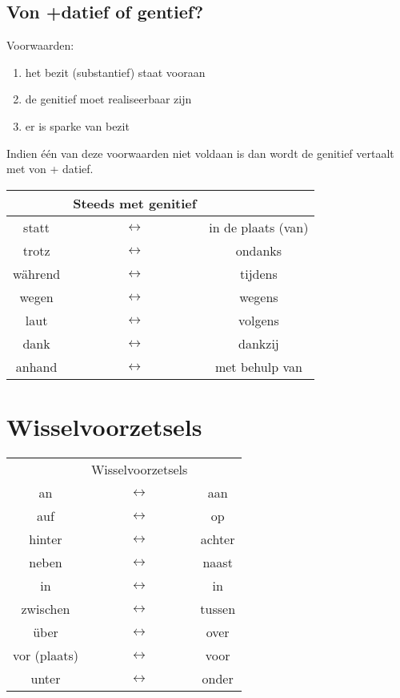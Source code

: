 \documentclass[main.tex]{subfiles}
\begin{document}
\subsection{Von +datief of gentief?}
Voorwaarden:
\begin{enumerate}
\item het bezit (substantief) staat vooraan
\item de genitief moet realiseerbaar zijn
\item er is sparke van bezit
\end{enumerate}
Indien één van deze voorwaarden niet voldaan is dan wordt de genitief vertaalt met von + datief.
\begin{tabular}{ccc}
 & Steeds met genitief &  \\ 
 \hline
statt & $\leftrightarrow$ & in de plaats (van) \\ 
trotz & $\leftrightarrow$ & ondanks \\ 
während & $\leftrightarrow$ & tijdens \\ 
wegen & $\leftrightarrow$ & wegens \\ 
laut & $\leftrightarrow$ & volgens \\ 
dank & $\leftrightarrow$ & dankzij \\ 
anhand & $\leftrightarrow$ & met behulp  van \\
\end{tabular} 

\section{Wisselvoorzetsels}

\begin{tabular}{ccc}
 & Wisselvoorzetsels &  \\ 
an & $\leftrightarrow$ & aan \\ 
auf & $\leftrightarrow$ & op \\ 
hinter & $\leftrightarrow$ & achter \\ 
neben & $\leftrightarrow$ & naast \\ 
in & $\leftrightarrow$ & in \\ 
zwischen & $\leftrightarrow$ & tussen \\ 
über & $\leftrightarrow$ & over \\ 
vor (plaats) & $\leftrightarrow$ & voor \\ 
unter & $\leftrightarrow$ & onder \\ 
\end{tabular} 
\end{document}
